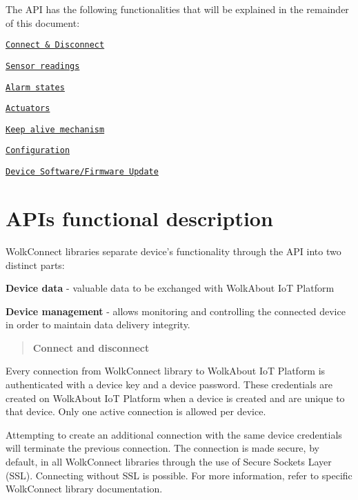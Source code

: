 The A\+PI has the following functionalities that will be explained in the remainder of this document\+:
\begin{DoxyItemize}
\item \href{#connect-and-disconnect}{\tt Connect \& Disconnect}
\item \href{#sensor-readings}{\tt Sensor readings}
\item \href{#alarms}{\tt Alarm states}
\item \href{#actuators}{\tt Actuators}
\item \href{#keep-alive-mechanism}{\tt Keep alive mechanism}
\item \href{#configuration}{\tt Configuration}
\item \href{#dfu}{\tt Device Software/\+Firmware Update}
\end{DoxyItemize}



 \section*{A\+PI\textquotesingle{}s functional description}



 Wolk\+Connect libraries separate device’s functionality through the A\+PI into two distinct parts\+:


\begin{DoxyItemize}
\item {\bfseries Device data} -\/ valuable data to be exchanged with Wolk\+About IoT Platform
\item {\bfseries Device management} -\/ allows monitoring and controlling the connected device in order to maintain data delivery integrity.
\end{DoxyItemize}





\label{_connect-and-disconnect}%
 \begin{quote}
{\bfseries Connect and disconnect} \end{quote}
Every connection from Wolk\+Connect library to Wolk\+About IoT Platform is authenticated with a device key and a device password. These credentials are created on Wolk\+About IoT Platform when a device is created and are unique to that device. Only one active connection is allowed per device.

Attempting to create an additional connection with the same device credentials will terminate the previous connection. The connection is made secure, by default, in all Wolk\+Connect libraries through the use of Secure Sockets Layer (S\+SL). Connecting without S\+SL is possible. For more information, refer to specific Wolk\+Connect library documentation.


